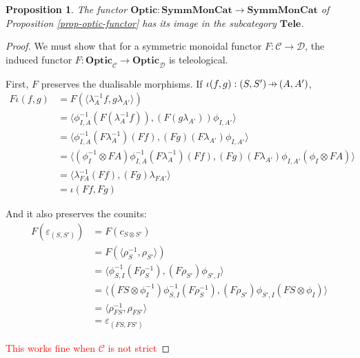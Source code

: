 \documentclass[11pt,a4paper]{article}
\theoremstyle{plain}
\newtheorem{proposition}[theorem]{Proposition}
\theoremstyle{definition}
\newcommand{\C}{\mathscr{C}}
\newcommand{\D}{\mathscr{D}}
\newcommand{\SymmMonCat}{\mathbf{SymmMonCat}}
\newcommand{\Tele}{\mathbf{Tele}}
\newcommand{\Optic}{\mathbf{Optic}}
\newcommand{\hto}{\ensuremath{\,\mathaccent\shortmid\rightarrow\,}}
\newcommand{\todo}[1]{\textcolor{red}{\small #1}}
\begin{document}
\begin{proposition}
The functor $\Optic : \SymmMonCat \to \SymmMonCat$ of Proposition \ref{prop-optic-functor} has its image in the subcategory $\Tele$.
\end{proposition}
\begin{proof}
We must show that for a symmetric monoidal functor $F : \C \to \D$, the induced functor $F : \Optic_\C \to \Optic_\D$ is teleological.

First, $F$ preserves the dualisable morphisms. If $\iota(f, g) : (S, S') \hto (A, A')$,
\begin{align*}
F\iota(f, g) 
&= F(\langle \lambda_A^{-1} f, g \lambda_{A'} \rangle) \\
&= \langle \phi^{-1}_{I,A} (F(\lambda_A^{-1} f)), (F(g \lambda_{A'})) \phi_{I,A'}\rangle \\
&= \langle \phi^{-1}_{I,A} (F\lambda_A^{-1}) (Ff), (Fg)(F \lambda_{A'}) \phi_{I,A'}\rangle \\
&= \langle (\phi^{-1}_I \otimes FA) \phi^{-1}_{I,A} (F\lambda_A^{-1}) (Ff), (Fg)(F \lambda_{A'}) \phi_{I,A'} (\phi_I \otimes FA) \rangle \\
&= \langle \lambda_{FA}^{-1} (Ff), (Fg)\lambda_{FA'} \rangle \\
&= \iota(Ff, Fg)
\end{align*}

And it also preserves the counits:
\begin{align*}
F(\varepsilon_{(S, S')})
&= F(c_{S \otimes S'}) \\
&= F(\langle \rho_S^{-1}, \rho_{S'} \rangle) \\
&= \langle \phi^{-1}_{S,I} (F \rho_S^{-1}), (F \rho_{S'}) \phi_{S',I}\rangle \\
&= \langle (FS \otimes \phi_I^{-1}) \phi^{-1}_{S,I} (F \rho_S^{-1}), (F \rho_{S'}) \phi_{S',I} (FS \otimes \phi_I)\rangle \\
&= \langle \rho_{FS}^{-1}, \rho_{FS'} \rangle \\
&= \varepsilon_{(FS, FS')}
\end{align*}

\todo{This works fine when $\C$ is not strict}
\end{proof}
\end{document}
